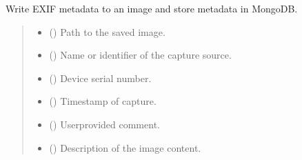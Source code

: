 \documentclass[letterpaper,10pt,english]{sphinxmanual}
\begin{document}
\begin{fulllineitems}
\label{\detokenize{modules/src.data_intake.data_intake.NVRConnection:src.data_intake.data_intake.NVRConnection.SavePictureData}}
\pysigstartsignatures
\pysiglinewithargsret
{}
{\sphinxparamcomma {}\sphinxparamcomma {}\sphinxparamcomma {}\sphinxparamcomma {}\sphinxparamcomma {}\sphinxparamcomma {}}
{}
\pysigstopsignatures
\sphinxAtStartPar
Write EXIF metadata to an image and store metadata in MongoDB.
\begin{quote}\begin{description}
\begin{itemize}
\item {} 
\sphinxAtStartPar
{} () \textendash{} Path to the saved image.

\item {} 
\sphinxAtStartPar
{} () \textendash{} Name or identifier of the capture source.

\item {} 
\sphinxAtStartPar
{} () \textendash{} Device serial number.

\item {} 
\sphinxAtStartPar
{} ({\hyperref[\detokenize{modules/src.pig_sorting_api.main:src.pig_sorting_api.main.datetime}]{}}) \textendash{} Timestamp of capture.

\item {} 
\sphinxAtStartPar
{} () \textendash{} User\sphinxhyphen{}provided comment.

\item {} 
\sphinxAtStartPar
{} () \textendash{} Description of the image content.


\end{itemize}
\end{description}
\end{quote}
\end{fulllineitems}
\end{document}
